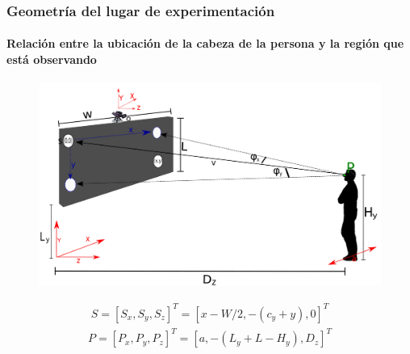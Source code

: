 \documentclass[10pt, compress]{beamer}
\begin{document}
\begin{frame}[fragile]
	\frametitle{Geometría del lugar de experimentación}
	\framesubtitle{Relación entre la ubicación de la cabeza de la persona y la región que está observando}
		 \begin{figure}[htbp] 
		 	\centering
		 	\includegraphics[width=.85\textwidth]{./pictures/escenario}
		 \end{figure}
		 \begin{eqnarray}
		 S= [S_x, S_y, S_z]^T= [x-W/2, -(c_y+y), 0]^T
		 \end{eqnarray}
		 \begin{eqnarray}
		 P=[P_x, P_y, P_z]^T= [a, -(L_y+L-H_y), D_z]^T
		 \end{eqnarray}
\end{frame}	
\end{document}
